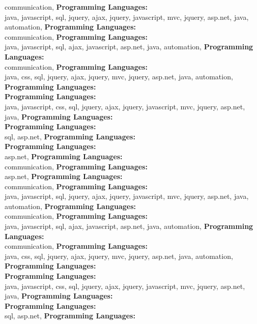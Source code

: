 communication, \textbf{Programming Languages:} \\
java, javascript, sql, jquery, ajax,  jquery, javascript, mvc, jquery, asp.net, java, automation, \textbf{Programming Languages:} \\
communication, \textbf{Programming Languages:} \\
java, javascript, sql, ajax, javascript, asp.net, java, automation, \textbf{Programming Languages:} \\
communication, \textbf{Programming Languages:} \\
java, css, sql, jquery, ajax,  jquery, mvc, jquery, asp.net, java, automation, \textbf{Programming Languages:} \\
\textbf{Programming Languages:} \\
java, javascript, css, sql, jquery, ajax,  jquery, javascript, mvc, jquery, asp.net, java, \textbf{Programming Languages:} \\
\textbf{Programming Languages:} \\
sql, asp.net, \textbf{Programming Languages:} \\
\textbf{Programming Languages:} \\
asp.net, \textbf{Programming Languages:} \\
communication, \textbf{Programming Languages:} \\
asp.net, \textbf{Programming Languages:} \\
communication, \textbf{Programming Languages:} \\
java, javascript, sql, jquery, ajax,  jquery, javascript, mvc, jquery, asp.net, java, automation, \textbf{Programming Languages:} \\
communication, \textbf{Programming Languages:} \\
java, javascript, sql, ajax, javascript, asp.net, java, automation, \textbf{Programming Languages:} \\
communication, \textbf{Programming Languages:} \\
java, css, sql, jquery, ajax,  jquery, mvc, jquery, asp.net, java, automation, \textbf{Programming Languages:} \\
\textbf{Programming Languages:} \\
java, javascript, css, sql, jquery, ajax,  jquery, javascript, mvc, jquery, asp.net, java, \textbf{Programming Languages:} \\
\textbf{Programming Languages:} \\
sql, asp.net, \textbf{Programming Languages:} \\
